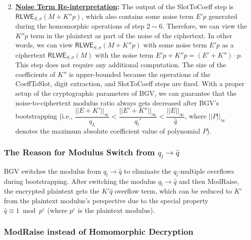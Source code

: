 \begin{enumerate}
$ $

\item \textbf{\textsf{\underline{Noise Term Re-interpretation}}:} The output of the \textsf{SlotToCoeff} step is $\textsf{RLWE}_{S, \sigma}(M + K''p)$, which also contains some noise term $E'p$ generated during the homomorphic operations of step $2 \sim 6$. Therefore, we can view the $K''p$ term in the plaintext as part of the noise of the ciphertext. In other words, we can view $\textsf{RLWE}_{S, \sigma}(M + K''p)$ with some noise term $E'p$ as a ciphertext $\textsf{RLWE}_{S, \sigma}(M)$ with the noise term $E'p + K''p = (E' + K'')\cdot p$. This step does not require any additional computation. The size of the coefficients of $K''$ is upper-bounded because the operations of the \textsf{CoeffToSlot}, digit extraction, and \textsf{SlotToCoeff} steps are fixed. With a proper setup of the cryptographic parameters of BGV, we can guarantee that the noise-to-ciphertext modulus ratio always gets decreased after BGV's bootstrapping (i.e., $\dfrac{||E + K'||_{\infty}}{q_L} < \dfrac{||E' + K''||_{\infty}}{q_l'} < \dfrac{||E||_{\infty}}{\hat{q}}$, where $||P||_\infty$ denotes the maximum absolute coefficient value of polynomial $P$).

\end{enumerate}



\subsubsection{The Reason for Modulus Switch from $q_l \rightarrow \hat{q}$} 

BGV switches the modulus from $q_l \rightarrow \hat{q}$ to eliminate the $q_l$-multiple overflows during bootstrapping. After switching the modulus $q_l \rightarrow \hat{q}$ and then \textsf{ModRaise}, the encrypted plaintext gets the $K'\hat{q}$ overflow term, which can be reduced to $K'$ from the plaintext modulus's perspective due to the special property $\hat{q} \equiv 1 \bmod p^\varepsilon$ (where $p^\varepsilon$ is the plaintext modulus).


\subsubsection{\textsf{ModRaise} instead of Homomorphic Decryption} 

